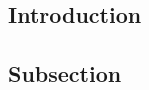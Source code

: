 \begin{multicols}{2}
\tableofcontents
\section{Introduction}
\lipsum[1]\cite{Bowker1985}
\subsection{Subsection}
\lipsum[1]
\end{multicols}